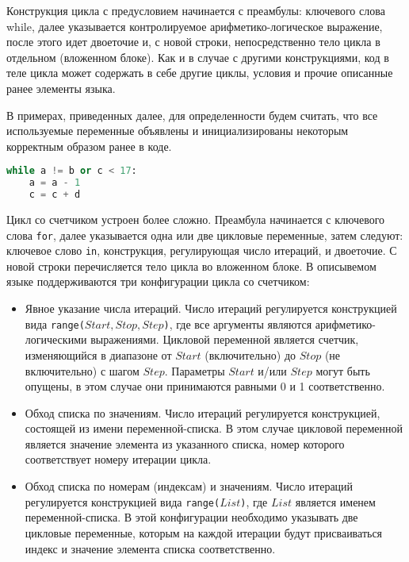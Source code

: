 Конструкция цикла с предусловием начинается с преамбулы: ключевого слова while, далее указывается контролируемое арифметико-логическое выражение, после этого идет двоеточие и, с новой строки, непосредственно тело цикла в отдельном (вложенном блоке).
Как и в случае с другими конструкциями, код в теле цикла может содержать в себе другие циклы, условия и прочие описанные ранее элементы языка.

В примерах, приведенных далее, для определенности будем считать, что все используемые переменные объявлены и инициализированы некоторым корректным образом ранее в коде.

\begin{lstlisting}[language=Python, caption=Пример цикла с предусловием]
while a != b or c < 17:
    a = a - 1
    c = c + d
\end{lstlisting}

Цикл со счетчиком устроен более сложно.
Преамбула начинается с ключевого слова \verb|for|, далее указывается одна или две цикловые переменные, затем следуют: ключевое слово \verb|in|, конструкция, регулирующая число итераций, и двоеточие.
С новой строки перечисляется тело цикла во вложенном блоке.
В описывемом языке поддерживаются три конфигурации цикла со счетчиком:

\begin{itemize}
    \item Явное указание числа итераций.
          Число итераций регулируется конструкцией вида \verb|range(|\(Start, Stop, Step\)\verb|)|, где все аргументы являются арифметико-логическими выражениями.
          Цикловой переменной является счетчик, изменяющийся в диапазоне от \(Start\) (включительно) до \(Stop\) (не включительно) с шагом \(Step\).
          Параметры \(Start\) и/или \(Step\) могут быть опущены, в этом случае они принимаются равными 0 и 1 соответственно.
    \item Обход списка по значениям.
          Число итераций регулируется конструкцией, состоящей из имени переменной-списка.
          В этом случае цикловой переменной является значение элемента из указанного списка, номер которого соответствует номеру итерации цикла.
    \item Обход списка по номерам (индексам) и значениям.
          Число итераций регулируется конструкцией вида \verb|range(|\(List\)\verb|)|, где \(List\) является именем переменной-списка.
          В этой конфигурации необходимо указывать две цикловые переменные, которым на каждой итерации будут присваиваться индекс и значение элемента списка соответственно.
\end{itemize}

